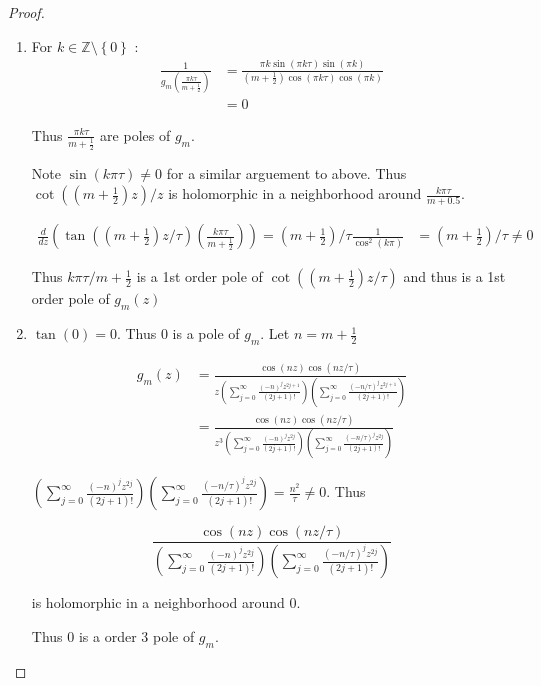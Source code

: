 \documentclass{article}
\newcommand{\Z}{\mathbb{Z}}
\begin{document}
\begin{proof}
\begin{enumerate}
        \item For $k \in \Z \setminus \left\{ 0 \right\}$ :  \begin{align*}
            \frac{1}{g_m\left(\frac{\pi k \tau}{m + \frac{1}{2}}\right)} &= \frac{\pi k \sin(\pi k \tau) \sin(\pi k)}{(m + \frac{1}{2}) \cos(\pi k \tau) \cos(\pi k)}\\
            &= 0
        \end{align*}

        Thus $\frac{\pi k \tau}{m + \frac{1}{2}}$ are poles of $g_m$. 
        
        Note $\sin(k \pi \tau) \neq 0$ for a similar arguement to above. Thus $\cot((m + \frac{1}{2}) z) / z$ is holomorphic in a neighborhood around $\frac{k \pi \tau}{m + 0.5}$.   
        
        
        \begin{align*}
            \frac{d}{dz}\left(\tan((m + \frac{1}{2})z / \tau)(\frac{k \pi \tau}{m + \frac{1}{2}})\right) = (m + \frac{1}{2}) / \tau \frac{1}{\cos^2(k \pi)} &= (m + \frac{1}{2}) / \tau \neq 0
        \end{align*}

        Thus $k \pi \tau / m + \frac{1}{2}$ is a 1st order pole of $\cot((m + \frac{1}{2}) z / \tau)$ and thus is a 1st order pole of $g_m(z)$ 
        
        \item $\tan(0) = 0$. Thus $0$ is a pole of $g_m$. Let $n = m + \frac{1}{2}$ 
        
        \begin{align*}
            g_m(z) &= \frac{\cos(nz) \cos(n z / \tau)}{z \left(\sum_{j = 0}^{\infty} \frac{(-n)^{j}z^{2j + 1}}{(2j + 1)!}\right)\left(\sum_{j = 0}^{\infty} \frac{(-n / \tau)^{j}z^{2j + 1}}{(2j + 1)!}\right)} \\
            &= \frac{\cos(nz) \cos(n z / \tau)}{z^3 \left(\sum_{j = 0}^{\infty} \frac{(-n)^{j}z^{2j}}{(2j + 1)!}\right)\left(\sum_{j = 0}^{\infty} \frac{(-n / \tau)^{j}z^{2j}}{(2j + 1)!}\right)}
        \end{align*}

        $\left(\sum_{j = 0}^{\infty} \frac{(-n)^{j}z^{2j}}{(2j + 1)!}\right)\left(\sum_{j = 0}^{\infty} \frac{(-n / \tau)^{j}z^{2j}}{(2j + 1)!}\right) = \frac{n^2}{\tau} \neq 0$. Thus
        
        \[\frac{\cos(nz) \cos(n z / \tau)}{\left(\sum_{j = 0}^{\infty} \frac{(-n)^{j}z^{2j}}{(2j + 1)!}\right)\left(\sum_{j = 0}^{\infty} \frac{(-n / \tau)^{j}z^{2j}}{(2j + 1)!}\right)}\]

        is holomorphic in a neighborhood around 0. 

        Thus $0$ is a order 3 pole of $g_m$.   
    \end{enumerate}
    
\end{proof}
\end{document}
